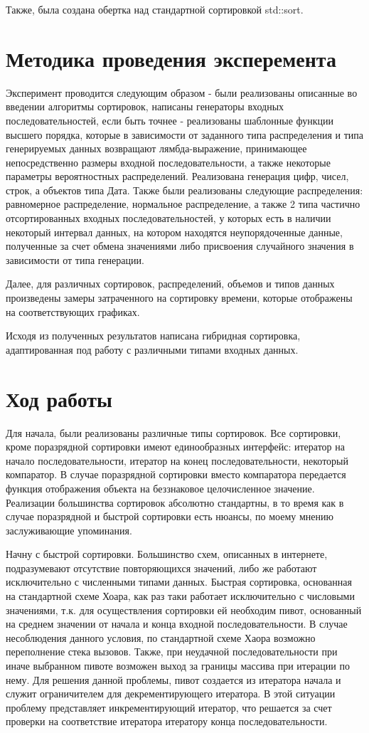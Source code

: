 \documentclass[a4paper, 14pt]{report}
\begin{document}
Также, была создана обертка над стандартной сортировкой std::sort. 


\section{Методика проведения эксперемента}
Эксперимент проводится следующим образом - были реализованы описанные во введении алгоритмы сортировок, написаны генераторы входных последовательностей,
если быть точнее - реализованы шаблонные функции высшего порядка, которые в зависимости от заданного типа распределения и типа генерируемых данных 
возвращают лямбда-выражение, принимающее непосредственно размеры входной последовательности, а также некоторые параметры вероятностных распределений.
Реализована генерация цифр, чисел, строк, а объектов типа Дата. Также были реализованы следующие распределения: равномерное распределение,
нормальное распределение, а также 2 типа частично отсортированных входных последовательностей, у которых есть в наличии некоторый интервал данных,
на котором находятся неупорядоченные данные, полученные за счет обмена значениями либо присвоения случайного значения в зависимости от типа генерации.

Далее, для различных сортировок, распределений, объемов и типов данных произведены замеры затраченного на сортировку времени, которые отображены на соответствующих графиках. 

Исходя из полученных результатов написана гибридная сортировка, адаптированная под работу с различными типами входных данных.
\section{Ход работы}
Для начала, были реализованы различные типы сортировок. Все сортировки, кроме поразрядной сортировки имеют единообразных интерфейс: итератор на начало последовательности, итератор на конец последовательности, некоторый компаратор. В случае поразрядной сортировки вместо компаратора передается функция отображения объекта на беззнаковое целочисленное значение. Реализации большинства сортировок абсолютно стандартны, в то время как в случае поразрядной и быстрой сортировки есть нюансы, по моему мнению заслуживающие упоминания.

Начну с быстрой сортировки. Большинство схем, описанных в интернете, подразумевают отсутствие повторяющихся значений, либо же работают исключительно с численными типами данных. Быстрая сортировка, основанная на стандартной схеме Хоара, как раз таки работает исключительно с числовыми значениями, т.к.
для осуществления сортировки ей необходим пивот, основанный на среднем значении от начала и конца входной последовательности. В случае несоблюдения данного условия, по стандартной схеме Хаора возможно переполнение стека вызовов. Также, при неудачной последовательности при иначе выбранном пивоте возможен выход за границы массива при итерации по нему. Для решения данной проблемы, пивот создается из итератора начала и служит ограничителем для декрементирующего итератора. В этой ситуации проблему представляет инкрементирующий итератор, что решается за счет проверки на соответствие итератора итератору конца последовательности.
\end{document}
